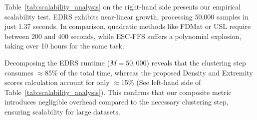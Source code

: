 \documentclass[preprint,12pt]{elsarticle}
\begin{document}
Table~\ref{tab:scalability_analysis} on the right-hand side presents our empirical scalability test. EDRS exhibits near-linear growth, processing 50,000 samples in just 1.37 seconds. In comparison, quadratic methods like FDMat or USL require between 200 and 400 seconds, while ESC-FFS suffers a polynomial explosion, taking over 10 hours for the same task.

\begin{table}[h]
\centering
\caption{\\ \textbf{Left:} Scalability comparison (Mean execution time in seconds) across dataset sizes ($M$). \textbf{Right:} Detailed runtime breakdown (Mean $\pm$ Std. Dev.) of EDRS internal components for $M=50,000$.}
\label{tab:scalability_analysis}
\end{table}

Decomposing the EDRS runtime ($M=50,000$) reveals that the clustering step consumes $\approx$85\% of the total time, whereas the proposed Density and Extremity scores calculation account for only $\approx$15\% (See left-hand side of Table~\ref{tab:scalability_analysis}). This confirms that our composite metric introduces negligible overhead compared to the necessary clustering step, ensuring scalability for large datasets.
\end{document}
